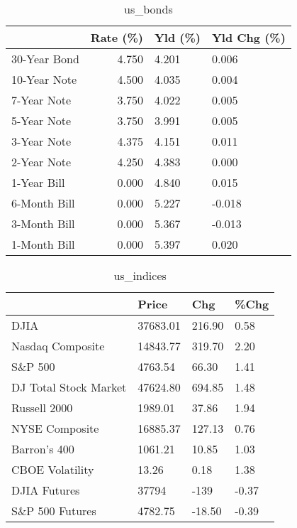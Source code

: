 \documentclass{article}%
\begin{document}
%


\begin{table}[htbp]%
\caption{us\_bonds}%
\centering%
\begin{adjustbox}{width=1\textwidth}%
\begin{tabular}{lrll}
\toprule
             &  Rate (\%) & Yld (\%) & Yld Chg (\%) \\
\midrule
30-Year Bond &     4.750 &   4.201 &       0.006 \\
10-Year Note &     4.500 &   4.035 &       0.004 \\
 7-Year Note &     3.750 &   4.022 &       0.005 \\
 5-Year Note &     3.750 &   3.991 &       0.005 \\
 3-Year Note &     4.375 &   4.151 &       0.011 \\
 2-Year Note &     4.250 &   4.383 &       0.000 \\
 1-Year Bill &     0.000 &   4.840 &       0.015 \\
6-Month Bill &     0.000 &   5.227 &      -0.018 \\
3-Month Bill &     0.000 &   5.367 &      -0.013 \\
1-Month Bill &     0.000 &   5.397 &       0.020 \\
\bottomrule
\end{tabular}
%
\end{adjustbox}%
\end{table}

%


\begin{table}[htbp]%
\caption{us\_indices}%
\centering%
\begin{adjustbox}{width=1\textwidth}%
\begin{tabular}{llll}
\toprule
                      &    Price &    Chg &  \%Chg \\
\midrule
                 DJIA & 37683.01 & 216.90 &  0.58 \\
     Nasdaq Composite & 14843.77 & 319.70 &  2.20 \\
              S\&P 500 &  4763.54 &  66.30 &  1.41 \\
DJ Total Stock Market & 47624.80 & 694.85 &  1.48 \\
         Russell 2000 &  1989.01 &  37.86 &  1.94 \\
       NYSE Composite & 16885.37 & 127.13 &  0.76 \\
         Barron's 400 &  1061.21 &  10.85 &  1.03 \\
      CBOE Volatility &    13.26 &   0.18 &  1.38 \\
         DJIA Futures &    37794 &   -139 & -0.37 \\
      S\&P 500 Futures &  4782.75 & -18.50 & -0.39 \\
\bottomrule
\end{tabular}
%
\end{adjustbox}%
\end{table}
\end{document}
